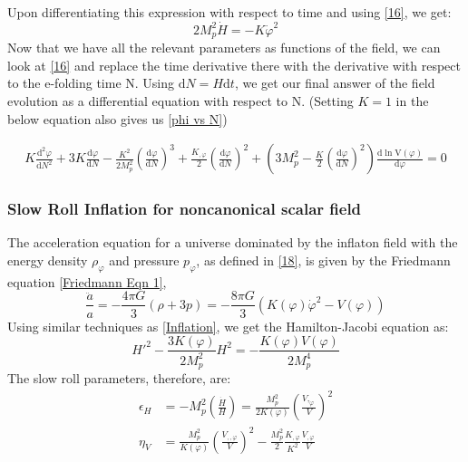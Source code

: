 \documentclass[aps,prd,reprint,preprintnumbers,showpacs,floatfix,nofootinbib,superscript address]{revtex4-2}
\begin{document}
Upon differentiating this expression with respect to time and using \cref{16}, we get:
\begin{equation} \label{20}
    2 M_p^2 \dot{H} = -  K \dot{\varphi}^2
\end{equation}
Now that we have all the relevant parameters as functions of the field, we can look at \cref{16} and replace the time derivative there with the derivative with respect to the e-folding time N. Using $\text{d}N = H \text{d}t$, we get our final answer of the field evolution as a differential equation with respect to N. (Setting $K = 1$ in the below equation also gives us \cref{phi vs N})
\begin{widetext}
\begin{subequations}
\begin{align}\label{Kphi vs N}
    K\frac{\text{d}^2\varphi}{\text{d}N^2} +3 K \frac{\text{d}\varphi}{\text{d}N}  - \frac{K^2}{2M_p^2} \left(\frac{\text{d}\varphi}{\text{d}N} \right)^3  +  \frac{K_{,\varphi}}{2}  \left(\frac{\text{d}\varphi}{\text{d}N} \right)^2 +  \left( 3 M_p^2 - \frac{K}{2} \left(\frac{\text{d}\varphi}{\text{d}N} \right)^2 \right) \frac{\text{d}\ln \text{V}(\varphi)}{\text{d} \varphi} = 0    
\end{align}
\end{subequations}
\end{widetext}
\subsubsection{Slow Roll Inflation for noncanonical scalar field}
The acceleration equation for a universe dominated by the inflaton field with the energy density $\rho_{\varphi}$ and pressure $p_{\varphi}$, as defined in \cref{18}, is given by the Friedmann equation \cref{Friedmann Eqn 1},
\begin{equation}
    \frac{\ddot{a}}{a} = -\frac{4\pi G}{3} (\rho +3p) = -\frac{8\pi G}{3} (K(\varphi){\dot{\varphi}}^2 - V(\varphi)) 
\end{equation}
Using similar techniques as \cref{Inflation}, we get the Hamilton-Jacobi equation as: 
\begin{equation}    \label{KHJ}
    H'^2 - \frac{3K(\varphi)}{2M_p^2}H^2 = - \frac{K(\varphi) V(\varphi)}{2M_p^4} 
\end{equation}
The slow roll parameters, therefore, are:
\begin{align}
    \epsilon_H &= - M_p^2 \left(\frac{\dot{H}}{H} \right) = \frac{M_p^2}{2 K(\varphi)} \left(\frac{V,_\varphi}{V}\right)^2 \\
    \eta_V &= \frac{M_p^2}{K(\varphi)} \left( \frac{V_{,,\varphi}}{V} \right)^2 - \frac{M_p^2}{2} \frac{K_{,\varphi}}{K^2} \frac{V_{,\varphi}}{V}
\end{align}
\end{document}
